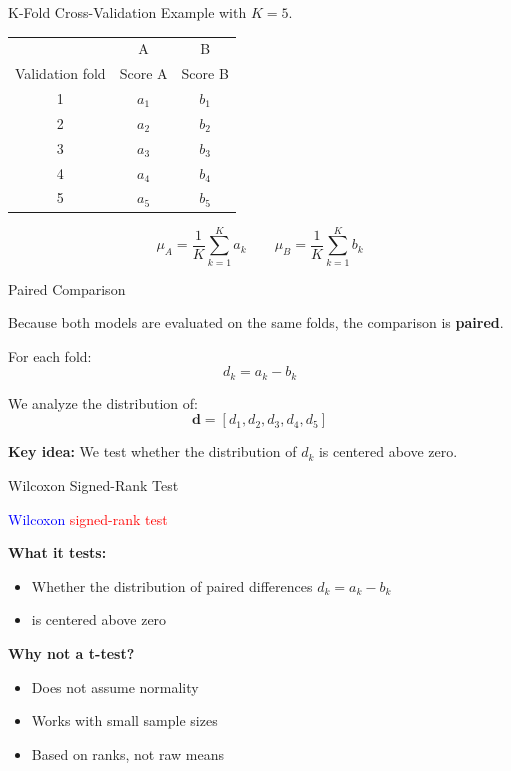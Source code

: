 \documentclass{beamer}
\begin{document}

\begin{frame}{K-Fold Cross-Validation}
Example with $K = 5$.

\begin{center}
\begin{tabular}{c|c|c}
     & A & B \\
Validation fold & Score A & Score B \\
\hline
1 & $a_1$ & $b_1$ \\
2 & $a_2$ & $b_2$ \\
3 & $a_3$ & $b_3$ \\
4 & $a_4$ & $b_4$ \\
5 & $a_5$ & $b_5$
\end{tabular}
\end{center}

\[
\mu_A =\frac{1}{K}\sum_{k=1}^{K} a_{k}
\qquad
\mu_B =\frac{1}{K}\sum_{k=1}^{K} b_{k}
\]

\end{frame}


\begin{frame}{Paired Comparison}

Because both models are evaluated on the same folds, the comparison is \textbf{paired}.

\bigskip

For each fold:
\[
d_k = a_k - b_k
\]

\bigskip

We analyze the distribution of:
\[
\mathbf{d} = [d_1, d_2, d_3, d_4, d_5]
\]

\bigskip

\textbf{Key idea:}
We test whether the distribution of $d_k$ is centered above zero.
\end{frame}


\begin{frame}{Wilcoxon Signed-Rank Test}

\begin{center}
\Huge
\textcolor{blue}{Wilcoxon} \textcolor{red}{signed-rank test}
\end{center}

\bigskip

\textbf{What it tests:}
\begin{itemize}
\item Whether the distribution of paired differences $d_k = a_k - b_k$
\item is centered above zero
\end{itemize}

\bigskip

\textbf{Why not a t-test?}
\begin{itemize}
\item Does not assume normality
\item Works with small sample sizes
\item Based on ranks, not raw means
\end{itemize}

\end{frame}
\end{document}
